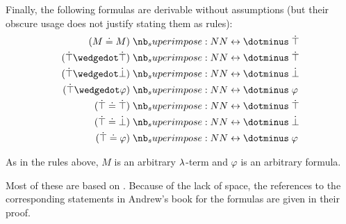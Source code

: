 \begin{proposition}
  Finally, the following formulas are derivable without assumptions (but their obscure usage does not justify stating them as rules):
  \begin{align}
    (M \syneq M)                &\syniff \syntop \label{eq:thm:simply_typed_hol_derivations/refl_iff_top} \\
    (\syntop \synwedge \syntop) &\syniff \syntop \label{eq:thm:simply_typed_hol_derivations/top_and_top} \\
    (\syntop \synwedge \synbot) &\syniff \synbot \label{eq:thm:simply_typed_hol_derivations/top_and_bot} \\
    (\syntop \synwedge \varphi) &\syniff \varphi \label{eq:thm:simply_typed_hol_derivations/top_and_phi} \\
    (\syntop \syneq \syntop)    &\syniff \syntop \label{eq:thm:simply_typed_hol_derivations/top_eq_top} \\
    (\syntop \syneq \synbot)    &\syniff \synbot \label{eq:thm:simply_typed_hol_derivations/top_eq_bot} \\
    (\syntop \syneq \varphi)    &\syniff \varphi \label{eq:thm:simply_typed_hol_derivations/top_eq_phi}
  \end{align}

  As in the rules above, \( M \) is an arbitrary \( {\mathrm \lambda} \)-term and \( \varphi \) is an arbitrary formula.
\end{proposition}
\begin{comments}
  \item Most of these are based on . Because of the lack of space, the references to the corresponding statements in Andrew's book for the formulas are given in their proof.
\end{comments}

